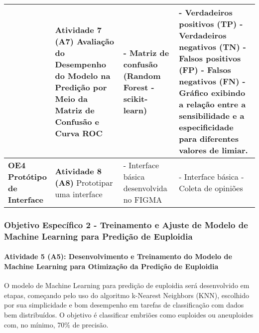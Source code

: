 \begin{table}[h!]
{\begin{tabular}{|p{3cm}|p{4cm}|p{3cm}|p{5cm}|}
      & 
      \textcolor[HTML]{133E78}{\textbf{Atividade 7 (A7)}} \newline
      Avaliação do Desempenho do Modelo na Predição por Meio da Matriz de Confusão e Curva ROC &
      - Matriz de confusão (Random Forest - scikit-learn) &
      - Verdadeiros positivos (TP) \newline
      - Verdadeiros negativos (TN) \newline
      - Falsos positivos (FP) \newline
      - Falsos negativos (FN) \newline
      - Gráfico exibindo a relação entre a sensibilidade e a especificidade para diferentes valores de limiar. \\
      \hline

      \parbox[c]{\linewidth}{
        \vspace{0.2cm}
        \centering
        \textcolor[HTML]{133E78}{\textbf{
          OE4 \\[0.1cm]
          Protótipo de \\[0.1cm]
          Interface
        }}
      }
      & 
      \textcolor[HTML]{133E78}{\textbf{Atividade 8 (A8)}} \newline
      Prototipar uma interface &
      - Interface básica desenvolvida no FIGMA &
      - Interface básica \newline
      - Coleta de opiniões \\
      \hline
    \end{tabular}
  }
\end{table}
\FloatBarrier


\subsubsection{\textbf{Objetivo Específico 2} - Treinamento e Ajuste de Modelo de Machine Learning para Predição de Euploidia}

\paragraph{\textbf{Atividade 5 (A5):} Desenvolvimento e Treinamento do Modelo de Machine Learning para Otimização da Predição de Euploidia}

O modelo de Machine Learning para predição de euploidia será desenvolvido em etapas, começando pelo uso do algoritmo k-Nearest Neighbors (KNN), escolhido por sua simplicidade e bom desempenho em tarefas de classificação com dados bem distribuídos. O objetivo é classificar embriões como euploides ou aneuploides com, no mínimo, 70\% de precisão.

